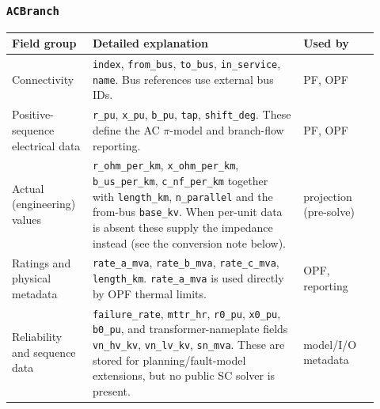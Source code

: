 \subsubsection*{\texttt{ACBranch}}
\begin{longtable}{L{0.20\linewidth}L{0.53\linewidth}L{0.19\linewidth}}
\toprule
Field group & Detailed explanation & Used by \\
\midrule
\endhead
Connectivity & \texttt{index}, \texttt{from\_bus}, \texttt{to\_bus}, \texttt{in\_service}, \texttt{name}.  Bus references use external bus IDs. & PF, OPF \\
Positive-sequence electrical data & \texttt{r\_pu}, \texttt{x\_pu}, \texttt{b\_pu}, \texttt{tap}, \texttt{shift\_deg}.  These define the AC \(\pi\)-model and branch-flow reporting. & PF, OPF \\
Actual (engineering) values & \texttt{r\_ohm\_per\_km}, \texttt{x\_ohm\_per\_km}, \texttt{b\_us\_per\_km}, \texttt{c\_nf\_per\_km} together with \texttt{length\_km}, \texttt{n\_parallel} and the from-bus \texttt{base\_kv}.  When per-unit data is absent these supply the impedance instead (see the conversion note below). & projection (pre-solve) \\
Ratings and physical metadata & \texttt{rate\_a\_mva}, \texttt{rate\_b\_mva}, \texttt{rate\_c\_mva}, \texttt{length\_km}.  \texttt{rate\_a\_mva} is used directly by OPF thermal limits. & OPF, reporting \\
Reliability and sequence data & \texttt{failure\_rate}, \texttt{mttr\_hr}, \texttt{r0\_pu}, \texttt{x0\_pu}, \texttt{b0\_pu}, and transformer-nameplate fields \texttt{vn\_hv\_kv}, \texttt{vn\_lv\_kv}, \texttt{sn\_mva}.  These are stored for planning/fault-model extensions, but no public SC solver is present. & model/I/O metadata \\
\bottomrule
\end{longtable}

